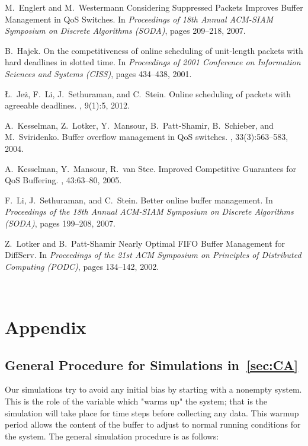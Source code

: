 \documentclass[oribibl]{llncs}
\begin{document}
\begin{thebibliography}{1}
M.~Englert and M.~Westermann
\newblock Considering Suppressed Packets Improves Buffer Management in QoS Switches.
\newblock In {\em Proceedings of 18th Annual ACM-SIAM Symposium on Discrete
  Algorithms (SODA)}, pages 209--218, 2007.

B.~Hajek.
\newblock On the competitiveness of online scheduling of unit-length packets
  with hard deadlines in slotted time.
\newblock In {\em Proceedings of 2001 Conference on Information Sciences and
  Systems (CISS)}, pages 434--438, 2001.

{\L}.~Je{\.z}, F.~Li, J.~Sethuraman, and C.~Stein.
\newblock Online scheduling of packets with agreeable deadlines.
, 9(1):5, 2012.

A.~Kesselman, Z.~Lotker, Y.~Mansour, B.~Patt-Shamir, B.~Schieber, and
  M.~Sviridenko.
\newblock Buffer overflow management in {Q}o{S} switches.
, 33(3):563--583, 2004.

A.~Kesselman, Y.~Mansour, R.~van Stee.
\newblock Improved Competitive Guarantees for QoS Buffering.
, 43:63--80, 2005.

F.~Li, J.~Sethuraman, and C.~Stein.
\newblock Better online buffer management.
\newblock In {\em Proceedings of the 18th Annual ACM-SIAM Symposium on Discrete
  Algorithms (SODA)}, pages 199--208, 2007.
  
Z.~Lotker and B.~Patt-Shamir
\newblock Nearly Optimal FIFO Buffer Management for DiffServ.
\newblock In {\em Proceedings of the 21st ACM Symposium on Principles of Distributed
Computing (PODC)}, pages 134--142, 2002.

\end{thebibliography}

\mbox{ }
\newpage
\mbox{ } 
\appendix
\section{Appendix}
\label{sec:app}
\setcounter{table}{0}
\renewcommand{\thetable}{A\arabic{table}}

\subsection{General Procedure for Simulations in~\ref{sec:CA}}
\label{app:CA}
Our simulations try to avoid any initial bias by starting with a nonempty system. This is the role of the variable  which "warms up" the system; that is the simulation will take place for  time steps before collecting any data. This warmup period allows the content of the buffer to adjust to normal running conditions for the system. The general simulation procedure is as follows:
\end{document}
